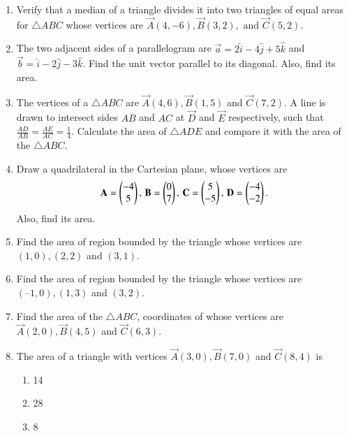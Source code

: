 \begin{enumerate}[label=\thesubsection.\arabic*,ref=\thesubsection.\theenumi]
\item Verify that a median of a triangle divides it into two triangles of equal areas for $\triangle ABC$ whose vertices are $\vec{A}(4, -6), \vec{B}(3, 2), \text{ and } \vec{C}(5, 2)$. 
		\label{10/7/3/5}
		\\
\solution
		
\item The two adjacent sides of a parallelogram are 
$\vec{a}= 2\hat{i}-4\hat{j}+5\hat{k}$  and  $\vec{b} =\hat{i}-2\hat{j}-3\hat{k}$.
Find the unit vector parallel to its diagonal. Also, find its area.\\
	\solution
		
\item The vertices of a $\triangle ABC$ are $\vec{A}(4,6), \vec{B}(1,5)$ and  $\vec{C}(7,2)$. A line is drawn to intersect sides $AB$ and $AC$ at $\vec{D}$ and $\vec{E}$ respectively, such that $\frac{AD}{AB} = \frac{AE}{AC} = \frac{1}{4}$. Calculate the area of $\triangle ADE$ and compare it with the area of the $\triangle ABC$.
\\
\solution
	
    \item Draw a quadrilateral in the Cartesian plane, whose vertices are 
    \begin{align}
        \mathbf{A} = \begin{pmatrix}-4\\5\end{pmatrix},\, \mathbf{B} = \begin{pmatrix}0\\7\end{pmatrix},\, 
        \mathbf{C} = \begin{pmatrix}5\\-5\end{pmatrix},\, \mathbf{D} = \begin{pmatrix}-4\\-2\end{pmatrix}.
    \end{align}
    Also, find its area.
\label{chapters/11/10/1/1}
   \\ 
    \solution 

\item Find the area of region bounded by the triangle whose
	vertices are $(1, 0), (2, 2)$ and $(3, 1)$. 
\item Find the area of region bounded by the triangle whose vertices
	are $(– 1, 0), (1, 3)$  and  $(3, 2)$. 
\item Find the area of the $\triangle ABC$, coordinates of whose vertices are $\vec{A}(2, 0), \vec{B}(4, 5)$ and $\vec{C}(6, 3)$.
\item The area of a triangle with vertices $\vec{A}(3, 0), \vec{B}(7, 0)$ and  $\vec{C}(8, 4)$ is
\begin{enumerate}
\item 14
\item 28
\item 8

\end{enumerate}
\end{enumerate}
